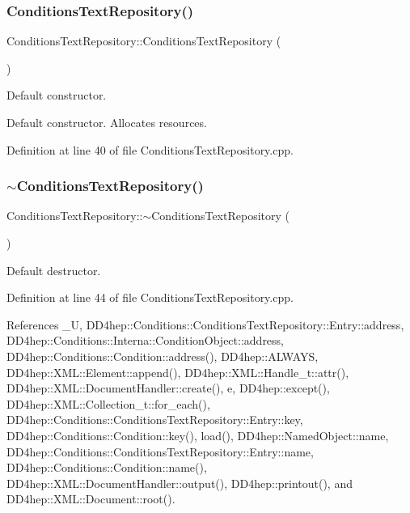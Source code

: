 \subsubsection{\texorpdfstring{Conditions\+Text\+Repository()}{ConditionsTextRepository()}}
{\footnotesize\ttfamily Conditions\+Text\+Repository\+::\+Conditions\+Text\+Repository (\begin{DoxyParamCaption}{ }\end{DoxyParamCaption})}



Default constructor. 

Default constructor. Allocates resources. 

Definition at line 40 of file Conditions\+Text\+Repository.\+cpp.

\hypertarget{class_d_d4hep_1_1_conditions_1_1_conditions_text_repository_af70e49d05e4819f28d4516fab871bd69}{}\label{class_d_d4hep_1_1_conditions_1_1_conditions_text_repository_af70e49d05e4819f28d4516fab871bd69} 
\subsubsection{\texorpdfstring{$\sim$\+Conditions\+Text\+Repository()}{~ConditionsTextRepository()}}
{\footnotesize\ttfamily Conditions\+Text\+Repository\+::$\sim$\+Conditions\+Text\+Repository (\begin{DoxyParamCaption}{ }\end{DoxyParamCaption})\hspace{0.3cm}{\ttfamily [virtual]}}



Default destructor. 



Definition at line 44 of file Conditions\+Text\+Repository.\+cpp.



References \+\_\+U, D\+D4hep\+::\+Conditions\+::\+Conditions\+Text\+Repository\+::\+Entry\+::address, D\+D4hep\+::\+Conditions\+::\+Interna\+::\+Condition\+Object\+::address, D\+D4hep\+::\+Conditions\+::\+Condition\+::address(), D\+D4hep\+::\+A\+L\+W\+A\+YS, D\+D4hep\+::\+X\+M\+L\+::\+Element\+::append(), D\+D4hep\+::\+X\+M\+L\+::\+Handle\+\_\+t\+::attr(), D\+D4hep\+::\+X\+M\+L\+::\+Document\+Handler\+::create(), e, D\+D4hep\+::except(), D\+D4hep\+::\+X\+M\+L\+::\+Collection\+\_\+t\+::for\+\_\+each(), D\+D4hep\+::\+Conditions\+::\+Conditions\+Text\+Repository\+::\+Entry\+::key, D\+D4hep\+::\+Conditions\+::\+Condition\+::key(), load(), D\+D4hep\+::\+Named\+Object\+::name, D\+D4hep\+::\+Conditions\+::\+Conditions\+Text\+Repository\+::\+Entry\+::name, D\+D4hep\+::\+Conditions\+::\+Condition\+::name(), D\+D4hep\+::\+X\+M\+L\+::\+Document\+Handler\+::output(), D\+D4hep\+::printout(), and D\+D4hep\+::\+X\+M\+L\+::\+Document\+::root().



